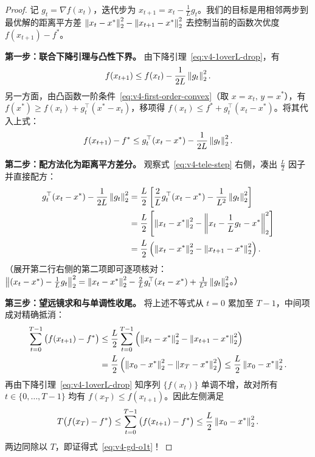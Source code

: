 \begin{proof}
记 $g_t = \nabla f(x_t)$，迭代步为 $x_{t+1} = x_t - \frac{1}{L}g_t$。我们的目标是用相邻两步到最优解的距离平方差 $\left\|x_t - x^*\right\|_2^2 - \left\|x_{t+1} - x^*\right\|_2^2$ 去控制当前的函数次优度 $f(x_{t+1}) - f^*$。

\textbf{第一步：联合下降引理与凸性下界。} 由下降引理~\eqref{eq:v4-1overL-drop}，有
\[
  f(x_{t+1}) \le f(x_t) - \frac{1}{2L}\left\|g_t\right\|_2^2.
\]
另一方面，由凸函数一阶条件~\eqref{eq:v4-first-order-convex}（取 $x=x_t,\, y=x^*$），有 $f(x^*) \ge f(x_t) + g_t^\top(x^* - x_t)$，移项得 $f(x_t) \le f^* + g_t^\top (x_t - x^*)$。将其代入上式：
\begin{equation}\label{eq:v4-tele-step}
  f(x_{t+1}) - f^* \le g_t^\top (x_t - x^*) - \frac{1}{2L}\left\|g_t\right\|_2^2.
\end{equation}

\textbf{第二步：配方法化为距离平方差分。} 观察式~\eqref{eq:v4-tele-step} 右侧，凑出 $\frac{L}{2}$ 因子并直接配方：
\begin{align*}
  g_t^\top (x_t - x^*) - \frac{1}{2L}\left\|g_t\right\|_2^2
  &= \frac{L}{2}\left[\frac{2}{L}g_t^\top (x_t - x^*) - \frac{1}{L^2}\left\|g_t\right\|_2^2\right] \\
  &= \frac{L}{2}\left[\left\|x_t - x^*\right\|_2^2 - \left\|x_t - \frac{1}{L}g_t - x^*\right\|_2^2\right] \\
  &= \frac{L}{2}\left(\left\|x_t - x^*\right\|_2^2 - \left\|x_{t+1} - x^*\right\|_2^2\right).
\end{align*}
（展开第二行右侧的第二项即可逐项核对：$\left\|(x_t-x^*) - \frac{1}{L}g_t\right\|_2^2 = \left\|x_t-x^*\right\|_2^2 - \frac{2}{L}g_t^\top(x_t-x^*) + \frac{1}{L^2}\left\|g_t\right\|_2^2$。）

\textbf{第三步：望远镜求和与单调性收尾。} 将上述不等式从 $t = 0$ 累加至 $T - 1$，中间项成对精确抵消：
\begin{align*}
  \sum_{t=0}^{T-1}\big(f(x_{t+1}) - f^*\big)
  &\le \frac{L}{2}\sum_{t=0}^{T-1}\left(\left\|x_t - x^*\right\|_2^2 - \left\|x_{t+1} - x^*\right\|_2^2\right) \\
  &= \frac{L}{2}\left(\left\|x_0 - x^*\right\|_2^2 - \left\|x_T - x^*\right\|_2^2\right)
  \le \frac{L}{2}\left\|x_0 - x^*\right\|_2^2.
\end{align*}
再由下降引理~\eqref{eq:v4-1overL-drop} 知序列 $\{f(x_t)\}$ 单调不增，故对所有 $t \in \{0, \dots, T-1\}$ 均有 $f(x_T) \le f(x_{t+1})$。因此左侧满足
\[
  T\big(f(x_T) - f^*\big) \le \sum_{t=0}^{T-1}\big(f(x_{t+1}) - f^*\big) \le \frac{L}{2}\left\|x_0 - x^*\right\|_2^2.
\]
两边同除以 $T$，即证得式~\eqref{eq:v4-gd-o1t}！
\end{proof}

